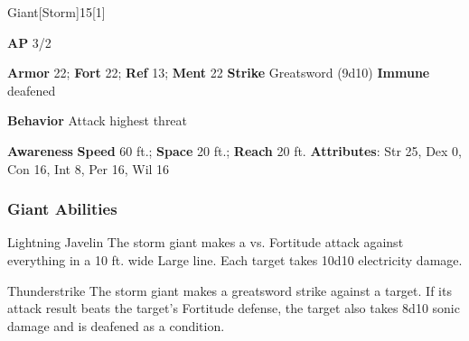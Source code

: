 \begin{monsection}{Giant}[Storm]{15}[1]
\vspace{-1em}\vspace{-1em}
\begin{spellcontent}
\begin{spelltargetinginfo}
{\textbf{AP} 3/2}

\pari \textbf{Armor} 22;
\textbf{Fort} 22;
\textbf{Ref} 13;
\textbf{Ment} 22
\pari \textbf{Strike} Greatsword  (9d10)
\pari \textbf{Immune} deafened


\pari \textbf{Behavior} Attack highest threat
\end{spelltargetinginfo}
\end{spellcontent}

\begin{monsterfooter}
\pari \textbf{Awareness} 
\pari \textbf{Speed} 60 ft.;
\textbf{Space} 20 ft.;
\textbf{Reach} 20 ft.
\pari \textbf{Attributes}:
Str 25,
Dex 0,
Con 16,
Int 8,
Per 16,
Wil 16
\end{monsterfooter}
\end{monsection}


\subsubsection{Giant Abilities}

\begin{freeability}{Lightning Javelin}
The storm giant makes a  vs. Fortitude attack against everything in a 10 ft. wide Large line.
\hit Each target takes 10d10 electricity damage.
\end{freeability}

\vspace{0.5em}
\begin{freeability}{Thunderstrike}
The storm giant makes a greatsword strike against a target.
If its attack result beats the target's Fortitude defense,
the target also takes 8d10 sonic damage
and is deafened as a condition.
\end{freeability}

